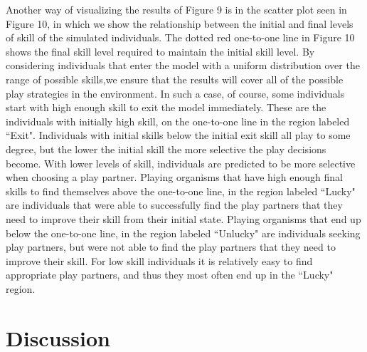 \documentclass[12pt, letterpaper, fleqn]{article}
\begin{document}
	Another way of visualizing the results of Figure 9 is in the scatter plot seen in Figure 10, in which we show the relationship between the initial  and final levels of skill of the simulated individuals.
	The dotted red one-to-one line in Figure 10 shows the final skill level required to maintain the initial skill level.
	By considering individuals that enter the model with a uniform distribution over the range of possible skills,we ensure that the results will cover all of the possible play strategies in the environment.    
	In such a case, of course, some individuals start with high enough skill to exit the model immediately.
	These are the individuals with initially high skill, on the one-to-one line in the region labeled ``Exit".
	Individuals with initial skills below the initial exit skill all play to some degree, but the lower the initial skill the more selective the play decisions become.
	With lower levels of skill, individuals are predicted to be more selective when choosing a play partner. %
	Playing organisms that have high enough final skills to find themselves above the one-to-one line, in the region labeled ``Lucky" are individuals that were able to successfully find the play partners that they need to improve their skill from their initial state.
	Playing organisms that end up below the one-to-one line, in the region labeled ``Unlucky" are individuals seeking play partners, but were not able to find the play partners that they need to improve their skill. 
	For low skill individuals it is relatively easy to find appropriate play partners, and thus they most often end up in the ``Lucky" region.

%
\section*{Discussion}
%
%
\end{document}
